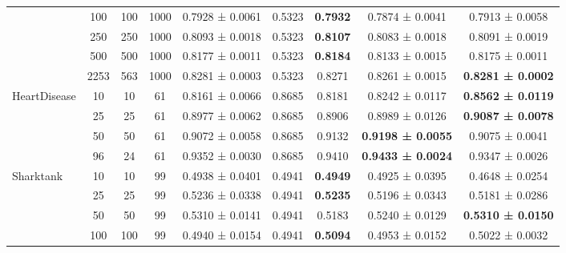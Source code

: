 \begin{table}
{\begin{tabular}[H]{@{}lcccccccc@{}}
                              & 100   & 100  & 1000 & 0.7928 ± 0.0061      & 0.5323               & \textbf{0.7932} & 0.7874 ± 0.0041          & 0.7913 ± 0.0058          \\
                              & 250   & 250  & 1000 & 0.8093 ± 0.0018      & 0.5323               & \textbf{0.8107} & 0.8083 ± 0.0018          & 0.8091 ± 0.0019          \\
                              & 500   & 500  & 1000 & 0.8177 ± 0.0011      & 0.5323               & \textbf{0.8184} & 0.8133 ± 0.0015          & 0.8175 ± 0.0011          \\
                              & 2253  & 563  & 1000 & 0.8281 ± 0.0003      & 0.5323               & 0.8271          & 0.8261 ± 0.0015          & \textbf{0.8281 ± 0.0002} \\
                              \midrule
\multirow{4}{*}{HeartDisease} & 10    & 10   & 61   & 0.8161 ± 0.0066      & 0.8685               & 0.8181          & 0.8242 ± 0.0117          & \textbf{0.8562 ± 0.0119} \\
                              & 25    & 25   & 61   & 0.8977 ± 0.0062      & 0.8685               & 0.8906          & 0.8989 ± 0.0126          & \textbf{0.9087 ± 0.0078} \\
                              & 50    & 50   & 61   & 0.9072 ± 0.0058      & 0.8685               & 0.9132          & \textbf{0.9198 ± 0.0055} & 0.9075 ± 0.0041          \\
                              & 96    & 24   & 61   & 0.9352 ± 0.0030      & 0.8685               & 0.9410          & \textbf{0.9433 ± 0.0024} & 0.9347 ± 0.0026          \\
                              \midrule
\multirow{5}{*}{Sharktank}    & 10    & 10   & 99   & 0.4938 ± 0.0401      & 0.4941               & \textbf{0.4949} & 0.4925 ± 0.0395          & 0.4648 ± 0.0254          \\
                              & 25    & 25   & 99   & 0.5236 ± 0.0338      & 0.4941               & \textbf{0.5235} & 0.5196 ± 0.0343          & 0.5181 ± 0.0286          \\
                              & 50    & 50   & 99   & 0.5310 ± 0.0141      & 0.4941               & 0.5183          & 0.5240 ± 0.0129          & \textbf{0.5310 ± 0.0150} \\
                              & 100   & 100  & 99   & 0.4940 ± 0.0154      & 0.4941               & \textbf{0.5094} & 0.4953 ± 0.0152          & 0.5022 ± 0.0032          \\

\end{tabular}}
\end{table}
